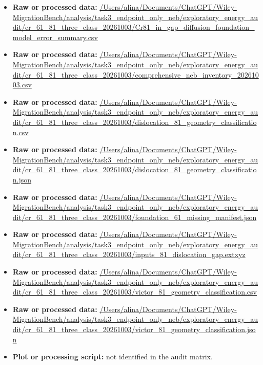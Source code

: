 \begin{itemize}[leftmargin=1.4em,noitemsep]
\item \textbf{Raw or processed data:} \url{/Users/alina/Documents/ChatGPT/Wiley-MigrationBench/analysis/task3_endpoint_only_neb/exploratory_energy_audit/cr_61_81_three_class_20261003/Cr81_in_gap_diffusion_foundation_model_error_summary.csv}
\item \textbf{Raw or processed data:} \url{/Users/alina/Documents/ChatGPT/Wiley-MigrationBench/analysis/task3_endpoint_only_neb/exploratory_energy_audit/cr_61_81_three_class_20261003/comprehensive_neb_inventory_20261003.csv}
\item \textbf{Raw or processed data:} \url{/Users/alina/Documents/ChatGPT/Wiley-MigrationBench/analysis/task3_endpoint_only_neb/exploratory_energy_audit/cr_61_81_three_class_20261003/dislocation_81_geometry_classification.csv}
\item \textbf{Raw or processed data:} \url{/Users/alina/Documents/ChatGPT/Wiley-MigrationBench/analysis/task3_endpoint_only_neb/exploratory_energy_audit/cr_61_81_three_class_20261003/dislocation_81_geometry_classification.json}
\item \textbf{Raw or processed data:} \url{/Users/alina/Documents/ChatGPT/Wiley-MigrationBench/analysis/task3_endpoint_only_neb/exploratory_energy_audit/cr_61_81_three_class_20261003/foundation_61_missing_manifest.json}
\item \textbf{Raw or processed data:} \url{/Users/alina/Documents/ChatGPT/Wiley-MigrationBench/analysis/task3_endpoint_only_neb/exploratory_energy_audit/cr_61_81_three_class_20261003/inputs_81_dislocation_gap.extxyz}
\item \textbf{Raw or processed data:} \url{/Users/alina/Documents/ChatGPT/Wiley-MigrationBench/analysis/task3_endpoint_only_neb/exploratory_energy_audit/cr_61_81_three_class_20261003/victor_81_geometry_classification.csv}
\item \textbf{Raw or processed data:} \url{/Users/alina/Documents/ChatGPT/Wiley-MigrationBench/analysis/task3_endpoint_only_neb/exploratory_energy_audit/cr_61_81_three_class_20261003/victor_81_geometry_classification.json}
\item \textbf{Plot or processing script:} not identified in the audit matrix.
\end{itemize}
